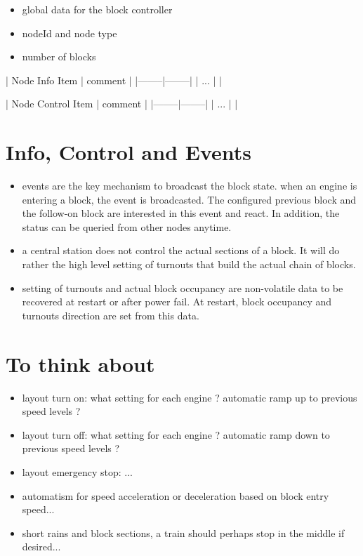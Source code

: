 \begin{itemize}
\begin{itemize}
\item global data for the block controller
\item nodeId and node type
\item number of blocks
\end{itemize}
\end{itemize}

| Node Info Item | comment |
|--------|--------|
| ... | |

| Node Control Item | comment |
|--------|--------|
| ... | |


\section{Info, Control and Events}

\begin{itemize}
\begin{itemize}
\item events are the key mechanism to broadcast the block state. when an engine is entering a block, the event is broadcasted. The configured previous block and the follow-on block are interested in this event and react. In addition, the status can be queried from other nodes anytime.
\item a central station does not control the actual sections of a block. It will do rather the high level setting of turnouts that build the actual chain of blocks.
\item setting of turnouts and actual block occupancy are non-volatile data to be recovered at restart or after power fail. At restart, block occupancy and turnouts direction are set from this data.
\end{itemize}
\end{itemize}

\section{To think about}

\begin{itemize}
\begin{itemize}
\item layout turn on: what setting for each engine ? automatic ramp up to previous speed levels ?
\item layout turn off: what setting for each engine ? automatic ramp down to previous speed levels ?
\item layout emergency stop: ...
\item automatism for speed acceleration or deceleration based on block entry speed...
\item short rains and block sections, a train should perhaps stop in the middle if desired...
\end{itemize}
\end{itemize}

